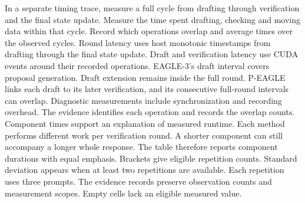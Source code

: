 \documentclass[conference,onecolumn]{IEEEtran}
\begin{document}
\begin{table}[!htp]
\begin{minipage}{\linewidth}
In a separate timing trace, measure a full cycle from drafting through verification and the final state update. Measure the time spent drafting, checking and moving data within that cycle. Record which operations overlap and average times over the observed cycles. Round latency uses host monotonic timestamps from drafting through the final state update. Draft and verification latency use CUDA events around their recorded operations. EAGLE-3's draft interval covers proposal generation. Draft extension remains inside the full round. P-EAGLE links each draft to its later verification, and its consecutive full-round intervals can overlap. Diagnostic measurements include synchronization and recording overhead. The evidence identifies each operation and records the overlap counts.
Component times support an explanation of measured runtime. Each method performs different work per verification round. A shorter component can still accompany a longer whole response. The table therefore reports component durations with equal emphasis.
Brackets give eligible repetition counts. Standard deviation appears when at least two repetitions are available. Each repetition uses three prompts. The evidence records preserve observation counts and measurement scopes. Empty cells lack an eligible measured value.
\end{minipage}
\end{table}
\end{document}
